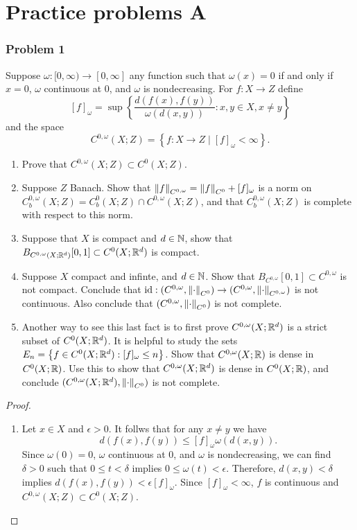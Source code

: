 \documentclass[a4paper]{article}
\begin{document}
\section*{Practice problems A}
\subsubsection*{Problem 1}
Suppose $\omega: [0, \infty) \to [0, \infty]$ any function 
such that $\omega(x) = 0$ if and only if $x = 0$, 
$\omega$ continuous at 
$0$, and $\omega$ is nondecreasing. For $f: X \to Z$ define
\[
[f]_\omega = \sup\left\{ \frac{d(f(x),f(y))}{\omega(d(x,y))} :
x, y \in X, x \neq y \right\}
\]
and the space 
\[
C^{0, \omega} (X; Z) = \left\{ f: X \to Z \mid [f]_\omega < \infty \right\}.
\]
{
\newcommand{\cw}{{C^{0, \omega}}}
\newcommand{\cwb}{{C^{0, \omega}_b}}
\begin{enumerate}
  \item Prove that $\cw(X; Z) \subset C^0(X; Z)$.

  \item Suppose $Z$ Banach. Show that $\norm{f}_{\cw} = \norm{f}_{C^0} + [f]_\omega$
  is a norm on $\cwb(X; Z) = C^0_b(X; Z) \cap \cw(X; Z)$, and 
  that $\cwb(X;Z)$ is complete with respect to this norm.

  \item Suppose that $X$ is compact and $d \in \mathbb{N}$, show that 
  $B_{C^{0, \omega}(X; \mathbb{R}^d)} [0, 1] \subset C^0(X; \mathbb{R}^d)$
  is compact.

  \item Suppose $X$ compact and infinte, and $d \in \mathbb{N}$.
  Show that $B_{\cw}[0,1] \subset \cw$ is not compact.
  Conclude that $\id: (\cw, \norm{\cdot}_{C^0}) \to (\cw, \norm{\cdot}_{\cw})$
  is not continuous. Also conclude that $(\cw, \norm{\cdot}_{C^0})$ 
  is not complete.

  \item Another way to see this last fact is to first prove 
  $\cw(X; \R^d)$ is a strict subset of $C^0(X; \mathbb{R}^d)$. It is helpful 
  to study the sets $E_n = \left\{ f \in C^0(X; \mathbb{R}^d) : [f]_\omega \leq n \right\}$.
  Show that $\cw(X; \R)$ is dense in $C^0(X; \mathbb{R})$. 
  Use this to show that $\cw(X; \R^d)$ is dense in $C^0(X; \mathbb{R})$,
  and conclude $(\cw(X; \R^d), \norm{\cdot}_{C^0})$ 
  is not complete.
\end{enumerate}


\begin{proof}
\begin{enumerate}
\item Let $x \in X$ and $\epsilon > 0$. It follws that for 
any $x \neq y$ we have 
\[
d(f(x), f(y)) \leq [f]_\omega \omega(d(x, y)).
\]
Since $\omega(0) = 0$, $\omega$ continuous
at $0$, and $\omega$ is nondecreasing, we can find 
$\delta > 0$ such that $0 \leq t < \delta$ implies 
$0 \leq \omega(t) < \epsilon$. 
Therefore,
$d(x, y) < \delta$ implies $d(f(x), f(y)) < \epsilon [f]_{\omega}$.
Since $[f]_{\omega} < \infty$, $f$ is continuous and 
$\cw (X; Z) \subset C^0(X; Z)$.


\end{enumerate}
\end{proof}}
\end{document}
